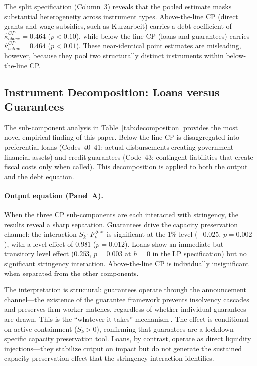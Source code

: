 The split specification (Column~3) reveals that the pooled estimate masks substantial heterogeneity across instrument types. Above-the-line CP (direct grants and wage subsidies, such as Kurzarbeit) carries a debt coefficient of $\hat{\kappa}_{above}^{CP} = 0.464$ ($p < 0.10$), while below-the-line CP (loans and guarantees) carries $\hat{\kappa}_{below}^{CP} = 0.464$ ($p < 0.01$). These near-identical point estimates are misleading, however, because they pool two structurally distinct instruments within below-the-line CP.

%

\subsection{Instrument Decomposition: Loans versus Guarantees}
\label{subsec:decomposition}

The sub-component analysis in Table~\ref{tab:decomposition} provides the most novel empirical finding of this paper. Below-the-line CP is disaggregated into preferential loans (Codes~40--41: actual disbursements creating government financial assets) and credit guarantees (Code~43: contingent liabilities that create fiscal costs only when called). This decomposition is applied to both the output and the debt equation.

\paragraph{Output equation (Panel~A).} When the three CP sub-components are each interacted with stringency, the results reveal a sharp separation. Guarantees drive the capacity preservation channel: the interaction $S_k \cdot F_k^{\text{guar}}$ is significant at the 1\% level ($-0.025$, $p = 0.002$), with a level effect of $0.981$ ($p = 0.012$). Loans show an immediate but transitory level effect ($0.253$, $p = 0.003$ at $h=0$ in the LP specification) but no significant stringency interaction. Above-the-line CP is individually insignificant when separated from the other components.

The interpretation is structural: guarantees operate through the announcement channel---the existence of the guarantee framework prevents insolvency cascades and preserves firm-worker matches, regardless of whether individual guarantees are drawn. This is the ``whatever it takes'' mechanism \citep{draghi2012}. The effect is conditional on active containment ($S_k > 0$), confirming that guarantees are a lockdown-specific capacity preservation tool. Loans, by contrast, operate as direct liquidity injections---they stabilize output on impact but do not generate the sustained capacity preservation effect that the stringency interaction identifies.

